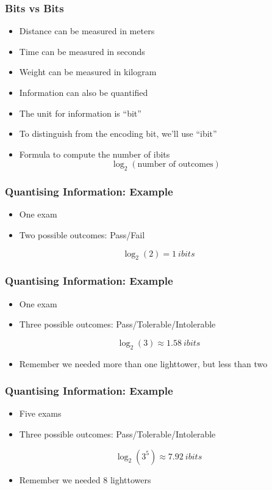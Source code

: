 \begin{frame}
  \frametitle{Bits vs Bits}
  \begin{itemize}
    \item Distance can be measured in meters
    \item Time can be measured in seconds
    \item Weight can be measured in kilogram
    \item Information can also be quantified
    \item The unit for information is ``bit''
    \item To distinguish from the encoding bit, we'll use ``ibit''
    \item Formula to compute the number of ibits
          \[
            \log_2(\textrm{number of outcomes})
          \]
  \end{itemize}
\end{frame}

\begin{frame}
  \frametitle{Quantising Information: Example}
  \begin{itemize}
    \item One exam
    \item Two possible outcomes: Pass/Fail
  \end{itemize}
  \vskip5mm
  \[
    \log_2(2) = \SI{1}{ibits}
  \]
\end{frame}

\begin{frame}
  \frametitle{Quantising Information: Example}
  \begin{itemize}
    \item One exam
    \item Three possible outcomes: Pass/Tolerable/Intolerable
  \end{itemize}
  \vskip5mm
  \[
    \log_2(3) \approx \SI{1.58}{ibits}
  \]
  \vskip5mm
  \begin{itemize}
    \item Remember we needed more than one lighttower, but less than two
  \end{itemize}
\end{frame}

\begin{frame}
  \frametitle{Quantising Information: Example}
  \begin{itemize}
    \item Five exams
    \item Three possible outcomes: Pass/Tolerable/Intolerable
  \end{itemize}
  \vskip5mm
  \[
    \log_2(3^5) \approx \SI{7.92}{ibits}
  \]
  \vskip5mm
  \begin{itemize}
    \item Remember we needed 8 lighttowers
  \end{itemize}
\end{frame}

